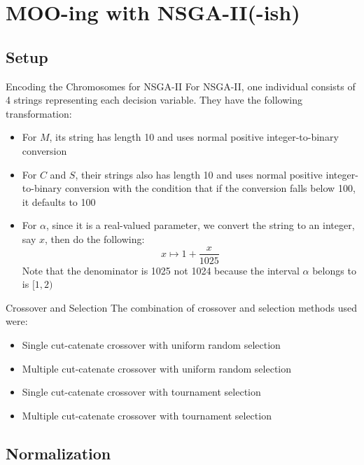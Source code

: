 \section{MOO-ing with NSGA-II(-ish)}

\frame{\insertsection}

\subsection{Setup}

\begin{frame}{Encoding the Chromosomes for NSGA-II}
    For NSGA-II, one individual consists of 4 strings representing each decision variable. They have the following transformation:
    \begin{itemize}
        \item For \(M\), its string has length 10 and uses normal positive integer-to-binary conversion
        \item For \(C\) and \(S\), their strings also has length 10 and uses normal positive integer-to-binary conversion with the condition that if the conversion falls below 100, it defaults to 100
        \item For \(\alpha\), since it is a real-valued parameter, we convert the string to an integer, say \(x\), then do the following:
            \[
                x \mapsto 1 + \frac{x}{1025}
            \]
            Note that the denominator is 1025 not 1024 because the interval \(\alpha\) belongs to is \([1, 2)\)
    \end{itemize}
\end{frame}

\begin{frame}{Crossover and Selection}
    The combination of crossover and selection methods used were:
    \begin{itemize}
        \item Single cut-catenate crossover with uniform random selection
        \item Multiple cut-catenate crossover with uniform random selection
        \item Single cut-catenate crossover with tournament selection
        \item Multiple cut-catenate crossover with tournament selection
    \end{itemize}
\end{frame}

\subsection{Normalization}


